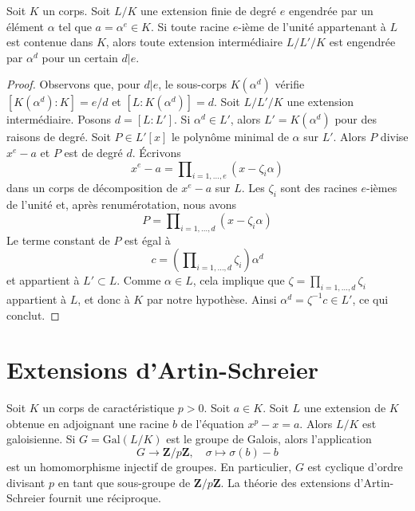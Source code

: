 \begin{lemma}
\label{lemma-subfields-kummer}
\begin{reference}
\cite[Théorème 5.2]{Radical}
\end{reference}
Soit $K$ un corps. Soit $L/K$ une extension finie de degré $e$
engendrée par un élément $\alpha$ tel que $a = \alpha^e \in K$.
Si toute racine $e$-ième de l'unité appartenant à $L$ est contenue dans $K$, alors 
toute extension intermédiaire $L/L'/K$ est engendrée par $\alpha^d$ pour un certain $d | e$.
\end{lemma}

\begin{proof}
Observons que, pour $d | e$, le sous-corps $K(\alpha^d)$ vérifie
$[K(\alpha^d) : K] = e/d$ et $[L : K(\alpha^d)] = d$.
Soit $L/L'/K$ une extension intermédiaire. Posons $d = [L : L']$. Si $\alpha^d \in L'$,
alors $L' = K(\alpha^d)$ pour des raisons de degré.
Soit $P \in L'[x]$ le polynôme minimal de $\alpha$ sur $L'$.
Alors $P$ divise $x^e - a$ et $P$ est de degré $d$.
Écrivons
$$
x^e - a = \prod\nolimits_{i = 1, \ldots, e} (x - \zeta_i \alpha)
$$
dans un corps de décomposition de $x^e - a$ sur $L$. Les $\zeta_i$ sont des racines
$e$-ièmes de l'unité et, après renumérotation, nous avons
$$
P = \prod\nolimits_{i = 1, \ldots, d} (x - \zeta_i \alpha)
$$
Le terme constant de $P$ est égal à
$$
c = (\prod\nolimits_{i = 1, \ldots, d} \zeta_i) \alpha^d
$$
et appartient à $L' \subset L$. Comme $\alpha \in L$, cela implique que
$\zeta = \prod_{i = 1, \ldots, d} \zeta_i$ appartient à $L$, et donc à $K$ par
notre hypothèse. Ainsi $\alpha^d = \zeta^{-1}c \in L'$, ce qui conclut.
\end{proof}




\section{Extensions d’Artin-Schreier}
\label{section-Artin-Schreier}

\noindent
Soit $K$ un corps de caractéristique $p > 0$. Soit $a \in K$. Soit $L$ une
extension de $K$ obtenue en adjoignant une racine $b$ de l'équation
$x^p - x = a$. Alors $L/K$ est galoisienne. Si $G = \text{Gal}(L/K)$ est le groupe
de Galois, alors l'application
$$
G \longrightarrow \mathbf{Z}/p\mathbf{Z},\quad
\sigma \longmapsto \sigma(b) - b
$$
est un homomorphisme injectif de groupes. En particulier, $G$ est cyclique
d'ordre divisant $p$ en tant que sous-groupe de $\mathbf{Z}/p\mathbf{Z}$.
La théorie des extensions d'Artin-Schreier fournit une réciproque.

